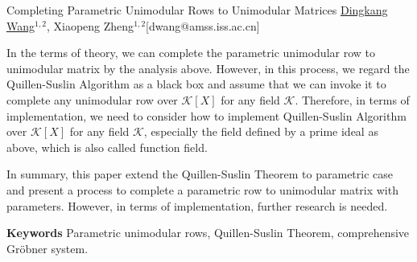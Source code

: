 \begin{abstract_online}{Completing Parametric Unimodular Rows to Unimodular Matrices}{%
        \underline{Dingkang Wang}$^{1,2}$, Xiaopeng Zheng$^{1,2}$}{[dwang@amss.iss.ac.cn]
        }
\begin{enumerate}
\end{enumerate}
\vspace{-0.2cm}
	In the terms of theory, we can complete the parametric unimodular row to unimodular matrix by the analysis above. However, in this process, we regard the Quillen-Suslin Algorithm as a black box and assume that we can invoke it to complete any unimodular row over $\mathcal{K}[X]$ for any field $\mathcal{K}$. Therefore, in terms of implementation, we need to consider how to implement Quillen-Suslin Algorithm over $\mathcal{K}[X]$ for any field $\mathcal{K}$, especially the field defined by a prime ideal as above, which is also called function field. 
	
	In summary, this paper extend the Quillen-Suslin Theorem to parametric case and present a process to complete a parametric row to unimodular matrix with parameters. However, in terms of implementation, further research is needed.



\textbf{Keywords} \newline{} Parametric unimodular rows, Quillen-Suslin Theorem, comprehensive Gr\"{o}bner system.











\vspace{-0.5cm}




\end{abstract_online}